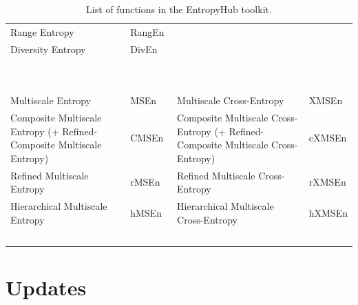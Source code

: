 \documentclass[12pt, a4paper, titlepage, openany]{book}
\begin{document}
\begin{center}
\begin{table}[!ht]
\begin{tabular}{|p{6cm}|p{15mm}|p{6cm}|p{20mm}|}
Range Entropy			&   RangEn 		 	&		\						&	\\ 
Diversity Entropy		&   DivEn 		 	&		\						&	\\ 
\						&	\				&		\						&	\\ 	 	 
\rowcolor{ehone} \emph{\textcolor{white}{Multiscale Entropy}} &	\emph{\textcolor{white}{Function}}	&  \emph{\textcolor{white}{Multiscale Cross-Entropy}}		&	\emph{\textcolor{white}{Function}} \\
Multiscale Entropy		&	MSEn			&	Multiscale Cross-Entropy	&	XMSEn \\
Composite Multiscale Entropy (+ Refined-Composite Multiscale Entropy) & 	CMSEn		&	Composite Multiscale Cross-Entropy (+ Refined-Composite Multiscale Cross-Entropy)	& cXMSEn \\
Refined Multiscale Entropy	& rMSEn			&	Refined Multiscale Cross-Entropy	&	rXMSEn  \\
Hierarchical Multiscale Entropy	&	hMSEn	&	Hierarchical Multiscale Cross-Entropy &	hXMSEn \\
\						&	\				&		\						&	\\ 	 	 
\hline
\end{tabular}

\caption{List of functions in the EntropyHub toolkit.}
\label{table: tab_1}
\end{table}
\end{center}

\newpage
\section{\textbf{Updates}}
\end{document}
